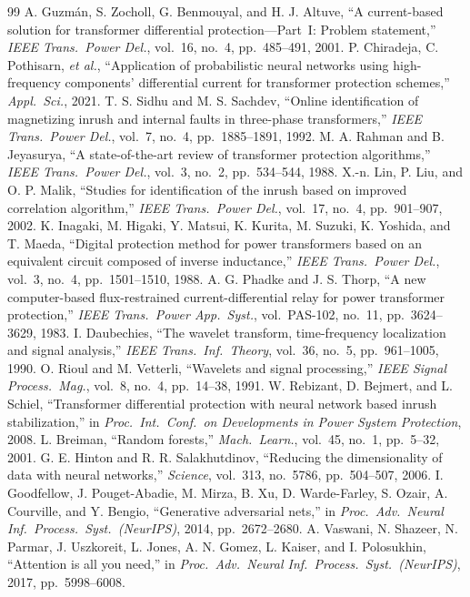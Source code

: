 \documentclass[12pt,a4paper,oneside]{report}
\begin{document}
\begin{thebibliography}{99}
 A. Guzm\'an, S. Zocholl, G. Benmouyal, and H. J. Altuve, ``A current-based solution for transformer differential protection---Part~I: Problem statement,'' \textit{IEEE Trans.\ Power Del.}, vol.~16, no.~4, pp.~485--491, 2001.
 P. Chiradeja, C. Pothisarn, \textit{et al.}, ``Application of probabilistic neural networks using high-frequency components' differential current for transformer protection schemes,'' \textit{Appl.\ Sci.}, 2021.
 T. S. Sidhu and M. S. Sachdev, ``Online identification of magnetizing inrush and internal faults in three-phase transformers,'' \textit{IEEE Trans.\ Power Del.}, vol.~7, no.~4, pp.~1885--1891, 1992.
 M. A. Rahman and B. Jeyasurya, ``A state-of-the-art review of transformer protection algorithms,'' \textit{IEEE Trans.\ Power Del.}, vol.~3, no.~2, pp.~534--544, 1988.
 X.-n. Lin, P. Liu, and O. P. Malik, ``Studies for identification of the inrush based on improved correlation algorithm,'' \textit{IEEE Trans.\ Power Del.}, vol.~17, no.~4, pp.~901--907, 2002.
 K. Inagaki, M. Higaki, Y. Matsui, K. Kurita, M. Suzuki, K. Yoshida, and T. Maeda, ``Digital protection method for power transformers based on an equivalent circuit composed of inverse inductance,'' \textit{IEEE Trans.\ Power Del.}, vol.~3, no.~4, pp.~1501--1510, 1988.
 A. G. Phadke and J. S. Thorp, ``A new computer-based flux-restrained current-differential relay for power transformer protection,'' \textit{IEEE Trans.\ Power App.\ Syst.}, vol.~PAS-102, no.~11, pp.~3624--3629, 1983.
 I. Daubechies, ``The wavelet transform, time-frequency localization and signal analysis,'' \textit{IEEE Trans.\ Inf.\ Theory}, vol.~36, no.~5, pp.~961--1005, 1990.
 O. Rioul and M. Vetterli, ``Wavelets and signal processing,'' \textit{IEEE Signal Process.\ Mag.}, vol.~8, no.~4, pp.~14--38, 1991.
 W. Rebizant, D. Bejmert, and L. Schiel, ``Transformer differential protection with neural network based inrush stabilization,'' in \textit{Proc.\ Int.\ Conf.\ on Developments in Power System Protection}, 2008.
 L. Breiman, ``Random forests,'' \textit{Mach.\ Learn.}, vol.~45, no.~1, pp.~5--32, 2001.
 G. E. Hinton and R. R. Salakhutdinov, ``Reducing the dimensionality of data with neural networks,'' \textit{Science}, vol.~313, no.~5786, pp.~504--507, 2006.
 I. Goodfellow, J. Pouget-Abadie, M. Mirza, B. Xu, D. Warde-Farley, S. Ozair, A. Courville, and Y. Bengio, ``Generative adversarial nets,'' in \textit{Proc.\ Adv.\ Neural Inf.\ Process.\ Syst.\ (NeurIPS)}, 2014, pp.~2672--2680.
 A. Vaswani, N. Shazeer, N. Parmar, J. Uszkoreit, L. Jones, A. N. Gomez, L. Kaiser, and I. Polosukhin, ``Attention is all you need,'' in \textit{Proc.\ Adv.\ Neural Inf.\ Process.\ Syst.\ (NeurIPS)}, 2017, pp.~5998--6008.
\end{thebibliography}
\end{document}
